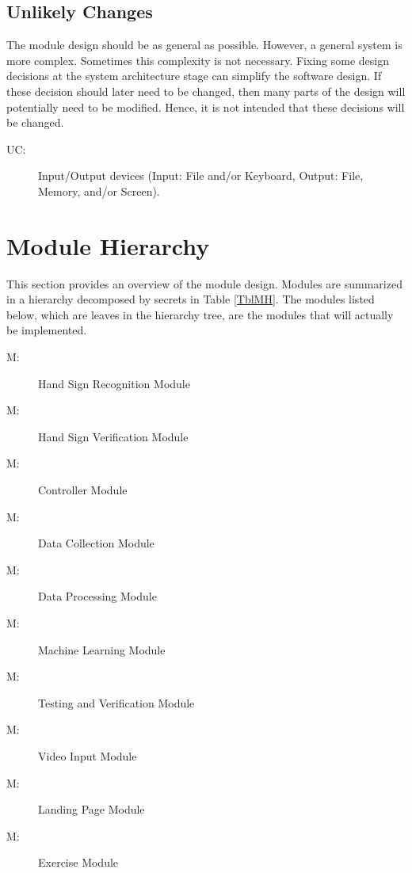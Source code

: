 \documentclass[12pt, titlepage]{article}
\newcounter{ucnum}
\newcommand{\uctheucnum}{UC\theucnum}
\newcounter{mnum}
\newcommand{\mthemnum}{M\themnum}
\begin{document}
\subsection{Unlikely Changes} \label{SecUchange}

The module design should be as general as possible. However, a general system is
more complex. Sometimes this complexity is not necessary. Fixing some design
decisions at the system architecture stage can simplify the software design. If
these decision should later need to be changed, then many parts of the design
will potentially need to be modified. Hence, it is not intended that these
decisions will be changed.

\begin{description}
\item[ \uctheucnum \label{ucIO}:] Input/Output devices
  (Input: File and/or Keyboard, Output: File, Memory, and/or Screen).
\end{description}

\section{Module Hierarchy} \label{SecMH}

This section provides an overview of the module design. Modules are summarized
in a hierarchy decomposed by secrets in Table \ref{TblMH}. The modules listed
below, which are leaves in the hierarchy tree, are the modules that will
actually be implemented.

\begin{description}
\item [ \mthemnum \label{m1}:] Hand Sign Recognition Module
\item [ \mthemnum \label{m2}:] Hand Sign Verification Module
\item [ \mthemnum \label{m3}:] Controller Module
\item [ \mthemnum \label{m4}:] Data Collection Module
\item [ \mthemnum \label{m5}:] Data Processing Module
\item [ \mthemnum \label{m6}:] Machine Learning Module
\item [ \mthemnum \label{m7}:] Testing and Verification Module
\item [ \mthemnum \label{m8}:] Video Input Module
\item [ \mthemnum \label{m9}:] Landing Page Module
\item [ \mthemnum \label{m10}:] Exercise Module
\end{description}
\end{document}

